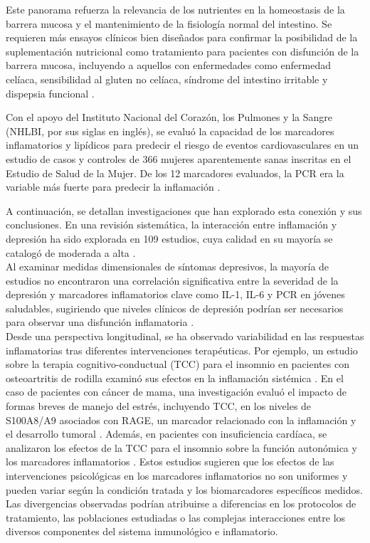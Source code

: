 \documentclass[stu, 12pt]{apa7}
\begin{document}
	Este panorama refuerza la relevancia de los nutrientes en la homeostasis
	de la barrera mucosa y el mantenimiento de la fisiología normal del
	intestino. Se requieren más ensayos clínicos bien diseñados para
	confirmar la posibilidad de la suplementación nutricional como
	tratamiento para pacientes con disfunción de la barrera mucosa,
	incluyendo a aquellos con enfermedades como enfermedad celíaca,
	sensibilidad al gluten no celíaca, síndrome del intestino irritable y
	dispepsia funcional \parencite{Farre2020}.

	Con el apoyo del Instituto Nacional del Corazón, los Pulmones y la
	Sangre (NHLBI, por sus siglas en inglés), se evaluó la capacidad de los
	marcadores inflamatorios y lipídicos para predecir el riesgo de eventos
	cardiovasculares en un estudio de casos y controles de 366 mujeres
	aparentemente sanas inscritas en el Estudio de Salud de la Mujer. De los
	12 marcadores evaluados, la PCR era la variable más fuerte para predecir
	la inflamación \parencite{ridkerHighsensitivityCreactiveProtein2004}.

	A continuación, se detallan investigaciones que han explorado esta
	conexión y sus conclusiones. En una revisión sistemática, la interacción
	entre inflamación y depresión ha sido explorada en 109 estudios, cuya
	calidad en su mayoría se catalogó de moderada a alta \parencite{Toenders2022}.\\

	Al examinar medidas dimensionales de síntomas depresivos, la mayoría de
	estudios no encontraron una correlación significativa entre la severidad
	de la depresión y marcadores inflamatorios clave como IL-1\textbeta, IL-6 y PCR
	en jóvenes saludables, sugiriendo que niveles clínicos de depresión
	podrían ser necesarios para observar una disfunción inflamatoria
	\parencite{Toenders2022}.\\

	Desde una perspectiva longitudinal, se ha observado variabilidad en las respuestas inflamatorias tras diferentes intervenciones terapéuticas. Por ejemplo, un estudio sobre la terapia cognitivo-conductual (TCC) para el insomnio en pacientes con osteoartritis de rodilla examinó sus efectos en la inflamación sistémica \parencite{munPreliminaryExaminationEffects2024}. En el caso de pacientes con cáncer de mama, una investigación evaluó el impacto de formas breves de manejo del estrés, incluyendo TCC, en los niveles de S100A8/A9 asociados con RAGE, un marcador relacionado con la inflamación y el desarrollo tumoral \parencite{taubEffectsRandomizedTrial2019}. Además, en pacientes con insuficiencia cardíaca, se analizaron los efectos de la TCC para el insomnio sobre la función autonómica y los marcadores inflamatorios \parencite{redekerEffectsCognitiveBehavioral2020}. Estos estudios sugieren que los efectos de las intervenciones psicológicas en los marcadores inflamatorios no son uniformes y pueden variar según la condición tratada y los biomarcadores específicos medidos. Las divergencias observadas podrían atribuirse a diferencias en los protocolos de tratamiento, las poblaciones estudiadas o las complejas interacciones entre los diversos componentes del sistema inmunológico e inflamatorio.
\end{document}
